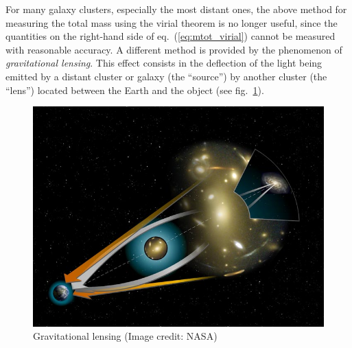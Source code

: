 For many galaxy clusters, especially the most distant ones, the above method for measuring the total mass using the virial theorem is no longer useful, since the quantities on the right-hand side of eq.\ (\ref{eq:mtot_virial}) cannot be measured with reasonable accuracy. A different method is provided by the phenomenon of {\it gravitational lensing}. This effect consists in the deflection of the light being emitted by a distant cluster or galaxy (the ``source'') by another cluster (the ``lens'') located between the Earth and the object (see fig.\ \ref{fig:lec10_6}).
\begin{figure}[ht]
\begin{center}
\includegraphics[scale=0.45]{Draw/lec10_6.png}
\end{center}
\caption{Gravitational lensing (Image credit: NASA)}
\label{fig:lec10_6}
\end{figure}

